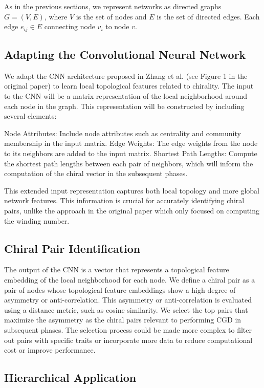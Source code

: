 \documentclass[12pt, a4paper]{article}
\begin{document}
As in the previous sections, we represent networks as directed graphs $G = (V, E)$, where $V$ is the set of nodes and $E$ is the set of directed edges.  Each edge $e_{ij} \in E$ connecting node $v_{i}$ to node $v$.

\subsection{Adapting the Convolutional Neural Network}

We adapt the CNN architecture proposed in Zhang et al. \cite{zhang2018machine}  (see Figure 1 in the original paper) to learn local topological features related to chirality. The input to the CNN will be a matrix representation of the local neighborhood around each node in the graph.  This representation will be constructed by including several elements:

Node Attributes:  Include node attributes such as centrality and community membership in the input matrix.
Edge Weights:  The edge weights from the node to its neighbors are added to the input matrix.
Shortest Path Lengths:  Compute the shortest path lengths between each pair of neighbors, which will inform the computation of the chiral vector in the subsequent phases.

This extended input representation captures both local topology and more global network features. This information is crucial for accurately identifying chiral pairs, unlike the approach in the original paper which only focused on computing the winding number.

\subsection{Chiral Pair Identification}

The output of the CNN is a vector that represents a topological feature embedding of the local neighborhood for each node.  We define a chiral pair as a pair of nodes whose topological feature embeddings show a high degree of asymmetry or anti-correlation. This asymmetry or anti-correlation is evaluated using a distance metric, such as cosine similarity. We select the top pairs that maximize the asymmetry as the chiral pairs relevant to performing CGD in subsequent phases.  The selection process could be made more complex to filter out pairs with specific traits or incorporate more data to reduce computational cost or improve performance.


\subsection{Hierarchical Application}
\end{document}
